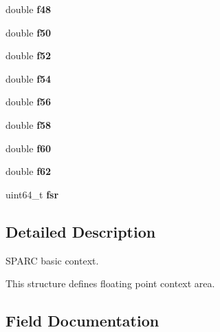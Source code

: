 \begin{DoxyCompactItemize}
double {\bfseries f48}
\item 
\mbox{\label{structContext__Control__fp_ac8f86709910271f4ebd79bc9ae121584}} 
double {\bfseries f50}
\item 
\mbox{\label{structContext__Control__fp_a6db0a17a3a5b4676976e87414c7e28f4}} 
double {\bfseries f52}
\item 
\mbox{\label{structContext__Control__fp_a2156ed44bfb99564ce73afdd9b8e8f5e}} 
double {\bfseries f54}
\item 
\mbox{\label{structContext__Control__fp_a5bb7c6487df2fd7702e76af3ff45eb83}} 
double {\bfseries f56}
\item 
\mbox{\label{structContext__Control__fp_a73d35e60c179a9b5e8256970fb16fccc}} 
double {\bfseries f58}
\item 
\mbox{\label{structContext__Control__fp_ade9b8fe3f61c1cc33452a12c34e872b1}} 
double {\bfseries f60}
\item 
\mbox{\label{structContext__Control__fp_a167720be9ac34b2f266b49f83acb09e2}} 
double {\bfseries f62}
\item 
\mbox{\label{structContext__Control__fp_a413431aee8b39ac33cbec53c6a0d4a15}} 
uint64\+\_\+t {\bfseries fsr}
\end{DoxyCompactItemize}


\subsection{Detailed Description}
S\+P\+A\+RC basic context. 

This structure defines floating point context area. 

\subsection{Field Documentation}
\mbox{\label{structContext__Control__fp_a2e7855c06f79ddaab47c7d5fec2eea97}} 
